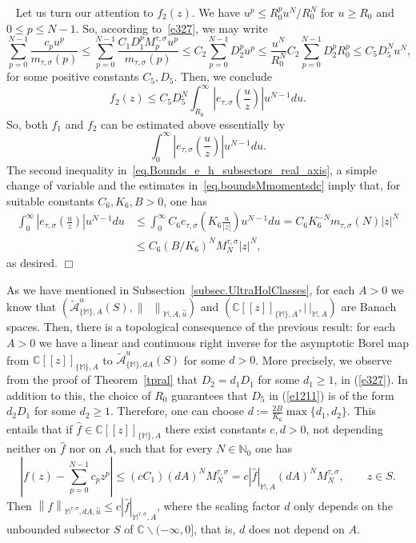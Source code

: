 \documentclass[12pt,leqno]{amsart}
\def\C{\mathbb{C}}
\def\N{\mathbb{N}}
\theoremstyle{plain}
\theoremstyle{definition}
\numberwithin{equation}{section}
\def\M{\mathbb{M}}
\newenvironment{proof1}{\medskip\par\noindent{\bf Proof}\ \normalfont}{\hfill $\Box$
\medskip\par}
\begin{document}
\begin{proof1}
Let us turn our attention to $f_{2}(z)$. We have $u^p\le R_0^pu^N/R_0^N$ for $u\ge R_0$ and $0\le p\le N-1$. So, according to~\eqref{e327}, we may write 
\begin{equation} \label{e1211}
\sum_{p=0}^{N-1}\frac{c_pu^p}{m_{\tau,\sigma}(p)} \leq 
\sum_{p=0}^{N-1} \frac{C_1D_1^pM^{\tau,\sigma}_pu^p}{m_{\tau,\sigma}(p)} 
\leq C_2 \sum_{p=0}^{N-1}D_2^pu^p\le\frac{u^N}{R_0^N} C_2\sum_{p=0}^{N-1}D_2^pR_0^p\le C_5D_5^Nu^N,
\end{equation}
for some positive constants $C_5,D_5$. Then, we conclude
$$f_2(z)\le C_5D^N_5\int_{R_0}^{\infty}\left|e_{\tau,\sigma}\left(\frac{u}{z}\right) \right|u^{N-1}du.$$
So, both $f_1$ and $f_2$ can be estimated above essentially by
$$
\int_{0}^{\infty}\left|e_{\tau,\sigma}\left(\frac{u}{z}\right) \right|u^{N-1}du.
$$
The second inequality in~\eqref{eq.Bounds_e_h_subsectors_real_axis}, a simple change of variable and the estimates in~\eqref{eq.boundsMmomentsdc} imply that, for suitable constants $C_6,K_6,B>0$, one has
\begin{align*}
\int_{0}^{\infty}\left|e_{\tau,\sigma}\left(\frac{u}{z}\right) \right|u^{N-1}du
&\le
\int_{0}^{\infty}C_6e_{\tau,\sigma}\left(K_6\frac{u}{|z|}\right)u^{N-1}du
=C_6K_6^{-N}m_{\tau,\sigma}(N)|z|^N\\
&\le C_6(B/K_6)^{N}M_N^{\tau,\sigma}|z|^N,
\end{align*}
as desired.
\end{proof1} 


As we have mentioned in Subsection~\ref{subsec.UltraHolClasses}, for each $A>0$ we know that $(\widetilde{\mathcal{A}}^u_{\{\M\},A}(S), \left\|\,\,\, \right\|_{\M,A,\overset{\sim}{u}})$ and  $(\C[[z]]_{\{\M\},A},\left| \  \right|_{\M,A})$ are Banach spaces. Then, there is a topological consequence of the previous result: for  each $A>0$ we have a  linear and continuous right inverse for the asymptotic Borel map from $\C[[z]]_{\{\M\},A}$ to $\tilde{\mathcal{A}}^u_{\{\M\},dA}(S)$ for some $d>0$.  More precisely, we observe from the proof of Theorem~\ref{tpral} that $D_2=d_1D_1$ for some $d_1\ge1$, in (\ref{e327}). In addition to this, the choice of $R_0$ guarantees that $D_5$ in (\ref{e1211}) is of the form $d_2D_1$ for some $d_2\ge1$. Therefore, one can choose $d:=\frac{2B}{K_6}\max\{d_1,d_2\}$. This entails that if $\hat{f}\in \C[[z]]_{\{\M\},A} $ there exist constants $c,d>0$, not depending neither on $\hat{f}$ nor on $A$, such that for every $N\in\N_0$ one has
$$\left|f(z)-\sum_{p=0}^{N-1} c_p z^p \right| \leq (cC_1)(d A)^N M^{\tau,\sigma}_{N}=
c|\hat{f}|_{\M,A}(dA)^NM^{\tau,\sigma}_N,\qquad z\in S.$$
Then  $\left\| f \right\|_{\M^{\tau,\sigma},dA,\overset{\sim}{u}} \leq c |\hat{f}|_{\M^{\tau,\sigma},A}$, where
the scaling factor $d$ only depends on the unbounded subsector $S$ of $\C\backslash(-\infty,0]$,  that is, $d$ does not depend on $A$.
\end{document}
